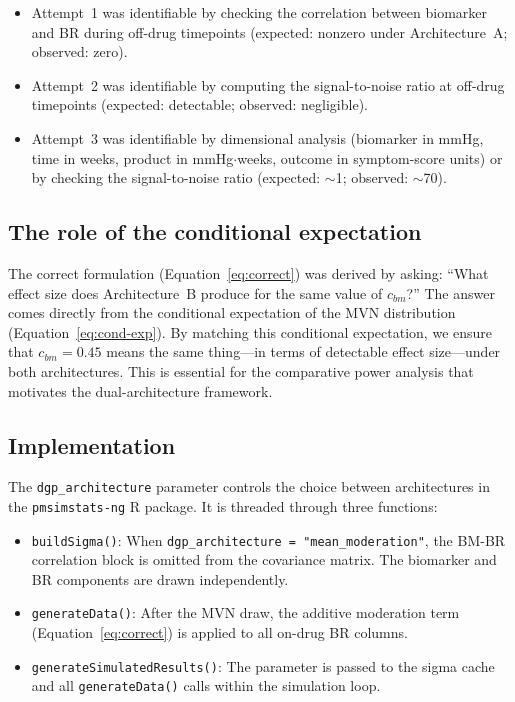\documentclass[11pt]{article}
\begin{document}
\begin{itemize}[leftmargin=2em]

\item Attempt~1 was identifiable by checking the correlation
  between biomarker and BR during off-drug timepoints
  (expected: nonzero under Architecture~A; observed: zero).

\item Attempt~2 was identifiable by computing the
  signal-to-noise ratio at off-drug timepoints (expected:
  detectable; observed: negligible).

\item Attempt~3 was identifiable by dimensional analysis
  (biomarker in mmHg, time in weeks, product in
  mmHg$\cdot$weeks, outcome in symptom-score units) or by
  checking the signal-to-noise ratio (expected: $\sim$1;
  observed: $\sim$70).

\end{itemize}

\subsection{The role of the conditional expectation}

The correct formulation (Equation~\ref{eq:correct}) was
derived by asking: ``What effect size does Architecture~B
produce for the same value of $c_{bm}$?'' The answer comes
directly from the conditional expectation of the MVN
distribution (Equation~\ref{eq:cond-exp}). By matching this
conditional expectation, we ensure that $c_{bm} = 0.45$
means the same thing---in terms of detectable effect
size---under both architectures. This is essential for the
comparative power analysis that motivates the dual-architecture
framework.

\subsection{Implementation}

The \texttt{dgp\_architecture} parameter controls the choice
between architectures in the \texttt{pmsimstats-ng} R
package. It is threaded through three functions:

\begin{itemize}[leftmargin=2em]

\item \texttt{buildSigma()}: When
  \texttt{dgp\_architecture = "mean\_moderation"}, the BM-BR
  correlation block is omitted from the covariance matrix.
  The biomarker and BR components are drawn independently.

\item \texttt{generateData()}: After the MVN draw, the
  additive moderation term
  (Equation~\ref{eq:correct}) is applied to all on-drug BR
  columns.

\item \texttt{generateSimulatedResults()}: The parameter is
  passed to the sigma cache and all \texttt{generateData()}
  calls within the simulation loop.

\end{itemize}
\end{document}
